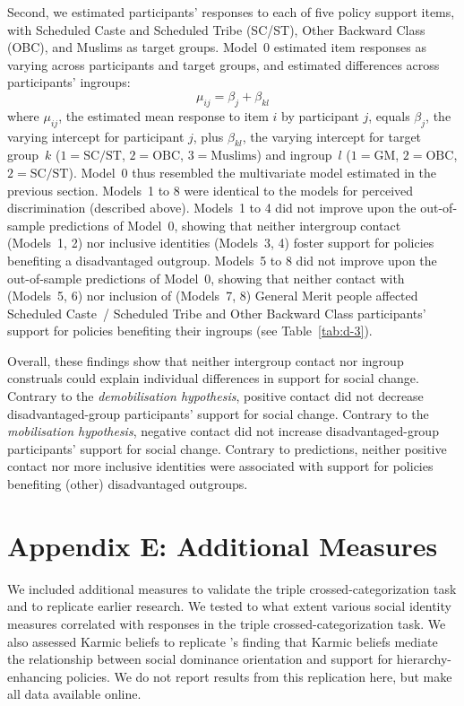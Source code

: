 \documentclass[12pt, a4paper]{article}
\begin{document}
Second, we estimated participants' responses to each of five policy support items, with Scheduled Caste and Scheduled Tribe (SC/ST), Other Backward Class (OBC), and Muslims as target groups. Model~0 estimated item responses as varying across participants and target groups, and estimated differences across participants' ingroups: $$ \mu_{ij} = \beta_{j} + \beta_{kl} $$ where $\mu_{ij}$, the estimated mean response to item $i$ by participant $j$, equals $\beta_j$, the varying intercept for participant $j$, plus $\beta_{kl}$, the varying intercept for target group~$k$ ($1 = \text{SC/ST}$, $2 = \text{OBC}$, $3 = \text{Muslims}$) and ingroup~$l$ ($1 = \text{GM}$, $2 = \text{OBC}$, $2 = \text{SC/ST}$). Model~0 thus resembled the multivariate model estimated in the previous section. Models~1 to 8 were identical to the models for perceived discrimination (described above). Models~1 to 4 did not improve upon the out-of-sample predictions of Model~0, showing that neither intergroup contact (Models~1, 2) nor inclusive identities (Models~3, 4) foster support for policies benefiting a disadvantaged outgroup.  Models~5 to 8 did not improve upon the out-of-sample predictions of Model~0, showing that neither contact with (Models~5, 6) nor inclusion of (Models~7, 8) General Merit people affected Scheduled Caste~/ Scheduled Tribe and Other Backward Class participants' support for policies benefiting their ingroups (see Table~\ref{tab:d-3}).

Overall, these findings show that neither intergroup contact nor ingroup construals could explain individual differences in support for social change. Contrary to the \emph{demobilisation hypothesis}, positive contact did not decrease disadvantaged-group participants' support for social change. Contrary to the \emph{mobilisation hypothesis}, negative contact did not increase disadvantaged-group participants' support for social change. Contrary to predictions, neither positive contact nor more inclusive identities were associated with support for policies benefiting (other) disadvantaged outgroups.

\section{Appendix E: Additional Measures}

We included additional measures to validate the triple crossed-categorization task and to replicate earlier research. We tested to what extent various social identity measures correlated with responses in the triple crossed-categorization task. We also assessed Karmic beliefs to replicate \citeauthor{cotterill_ideological_2014}'s \citeyear{cotterill_ideological_2014} finding that Karmic beliefs mediate the relationship between social dominance orientation and support for hierarchy-enhancing policies. We do not report results from this replication here, but make all data available online.
\end{document}
